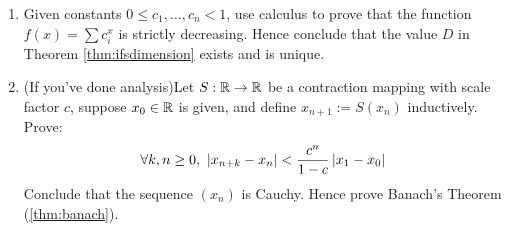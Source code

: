 \begin{exercises}
\begin{enumerate}
		\item Given constants $0\le c_1,\ldots,c_n<1$, use calculus to prove that the function $f(x)=\sum c_i^x$ is strictly decreasing. Hence conclude that the value $D$ in Theorem \ref{thm:ifsdimension} exists and is unique.
		
		\item (If you've done analysis)\lstsp Let $S:\mathbb{R}\to\mathbb{R}$ be a contraction mapping with scale factor $c$, suppose $x_0\in\mathbb{R}$ is given, and define $x_{n+1}:=S(x_n)$ inductively. Prove:
		\[
			\forall k,n\ge 0,\ \nm{x_{n+k}-x_n}<\frac{c^n}{1-c}\nm{x_1-x_0}
		\]
		Conclude that the sequence $(x_n)$ is Cauchy. Hence prove Banach's Theorem (\ref{thm:banach}).
	\end{enumerate}
\end{exercises}